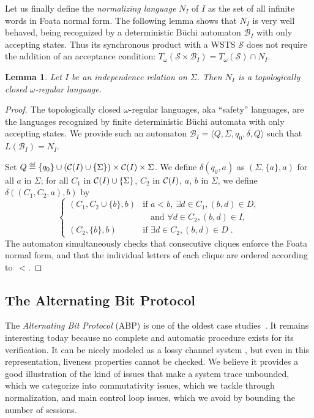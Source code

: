 \documentclass[11pt,reqno,a4paper]{amsart}
\newcommand{\eqdef}{\stackrel{\raisebox{-.15ex}{\scalebox{.5}{\upshape\textrm{def}}}}{=}}
\newcommand{\tup}[1]{\langle #1\rangle}
\theoremstyle{plain}
\newtheorem{lemma}[theorem]{Lemma}
\theoremstyle{definition}
\theoremstyle{remark}
\begin{document}
Let us finally define the \emph{normalizing language} $N_I$ of $I$ as
the set of all infinite words in Foata normal form.  The following lemma
shows that $N_I$ is very well behaved, being recognized by a
deterministic B\"uchi automaton $\mathcal{B}_I$ with only accepting
states.  Thus its synchronous product with a WSTS $\mathcal{S}$ does not
require the addition of an acceptance condition:
$T_\omega(\mathcal{S}\times\mathcal{B}_I)=T_\omega(\mathcal{S})\cap
N_I$.
\begin{lemma}\label{lem:fnfsafety}
  Let $I$ be an independence relation on $\Sigma$.  Then $N_I$ is a
  topologically closed $\omega$-regular language.
\end{lemma}
\begin{proof}
  The topologically closed $\omega$-regular languages, aka ``safety''
  languages, are the languages recognized by finite deterministic
  B\"uchi automata with only accepting states.  We provide such an
  automaton $\mathcal{B}_I=\tup{Q,\Sigma,q_0,\delta,Q}$ such that
  $L(\mathcal{B}_I)=N_I$.

  Set $Q\eqdef\{q_0\}\cup(\clq(I)\cup\{\Sigma\})\times\clq(I)\times\Sigma$.
  We define $\delta(q_0,a)$ as $(\Sigma,\{a\},a)$ for all $a$ in $\Sigma$;
  for all $C_1$ in $\mathcal{C}(I)\cup\{\Sigma\}$, $C_2$ in $\mathcal{C}(I)$, $a$, $b$
  in $\Sigma$, we define $\delta((C_1,C_2,a),b)$ by
  \begin{equation*}
    \begin{cases}(C_1,C_2\cup\{b\},b)&\text{if
    }a<b,~\exists d\in C_1, (b,d)\in D,\\&\phantom{\text{if }}\text{and }\forall d\in C_2, (b,d)\in I,\\
    (C_2,\{b\},b)&\text{if }\exists d\in C_2,(b,d)\in D\;.\end{cases}
  \end{equation*}
  The automaton simultaneously checks that consecutive cliques enforce
  the Foata normal form, and that the individual letters of each clique
  are ordered according to~$<$.
\end{proof}

\subsection{The Alternating Bit Protocol}\label{ax:abp}
The \emph{Alternating Bit Protocol} (ABP) is one of the oldest case
studies~\citep{boch80}.  It remains interesting today because no
complete and automatic procedure exists for its verification.  It can
be nicely modeled as a lossy channel system \citep[see][and the next
discussion ``A Quick Tour'']{fwlcs}, but even in this representation,
liveness properties cannot be checked.  We believe it provides a good
illustration of the kind of issues that make a system trace unbounded,
which we categorize into commutativity issues, which we tackle through
normalization, and main control loop issues, which we avoid by
bounding the number of sessions.
\end{document}
